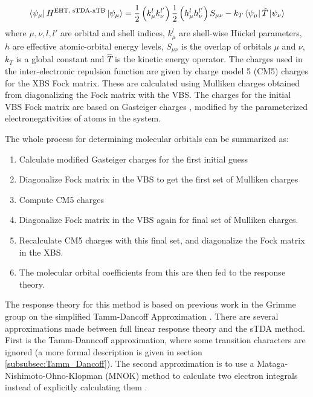\begin{equation}
\bra{\psi_\mu} H^{\text{EHT, sTDA-xTB}} \ket{\psi_\mu}= \frac{1}{2} \left(k^l_\mu k^{l'}_\nu\right) \frac{1}{2} \left(h^l_\mu h^{l'}_\nu\right) S_{\mu\nu} - k_T \bra{\psi_\mu}\hat{T}\ket{\psi_\nu}
\end{equation}
%
where $\mu,\nu,l,l'$ are orbital and shell indices, $k^l_\mu$ are shell-wise 
H{\"u}ckel parameters, $h$ are effective atomic-orbital energy levels, $S_{\mu\nu}$
is the overlap of orbitals $\mu$ and $\nu$, $k_T$ is a global constant and $\hat{T}$
is the kinetic energy operator. The charges used in the inter-electronic repulsion 
function are given by charge model 5 (CM5) \cite{Marenich2012} charges for the XBS
Fock matrix. These are calculated using Mulliken charges obtained from diagonalizing
the Fock matrix with the VBS. The charges for the initial VBS Fock matrix are based
on Gasteiger charges \cite{Gasteiger1978}, modified by the parameterized
electronegativities of atoms in the system.

The whole process for determining molecular orbitals can be summarized as:
\begin{enumerate}
	\item Calculate modified Gasteiger charges for the first initial guess
	\item Diagonalize Fock matrix in the VBS to get the first set of Mulliken charges
	\item Compute CM5 charges
	\item Diagonalize Fock matrix in the VBS again for final set of Mulliken charges.
	\item Recalculate CM5 charges with this final set, and diagonalize the Fock matrix in the XBS. 
	\item The molecular orbital coefficients from this are then fed to the response theory.
\end{enumerate}

The response theory for this method is based on previous work in the Grimme group
on the simplified Tamm-Dancoff Approximation \cite{Grimme2013}. There are several
approximations made between full linear response theory and the sTDA method. First
is the Tamm-Danncoff approximation, where some transition characters are ignored
(a more formal description is given in section \ref{subsubsec:Tamm_Dancoff}). The
second approximation is to use a Mataga-Nishimoto-Ohno-Klopman (MNOK) method to 
calculate two electron integrals instead of explicitly calculating them \cite{Nishimoto1957, Ohno1964, Klopman1964}.

